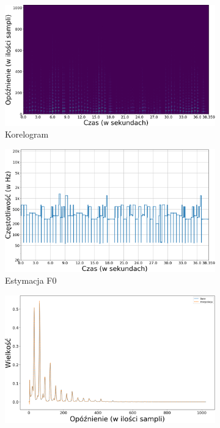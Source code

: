 \documentclass[12pt,a4paper,twoside]{mwart}
\begin{document}
\begin{figure}[H]
  \begin{subfigure}{.49\textwidth}
    \includegraphics[width=1.\linewidth]{images/ACLOS/Korelogram_cropped.png}
    \caption{Korelogram}
  \end{subfigure}
  \begin{subfigure}{.5\textwidth}
    \includegraphics[width=1.\linewidth]{images/ACLOS/Estymacja_f0_cropped.png}
    \caption{Estymacja F0}
  \end{subfigure}
  \newline
  \begin{subfigure}{0.5\textwidth}
    \centering
    \includegraphics[width=1.\linewidth]{images/ACLOS/interpolacja_full_cropped.png}

\end{subfigure}
\end{figure}
\end{document}
